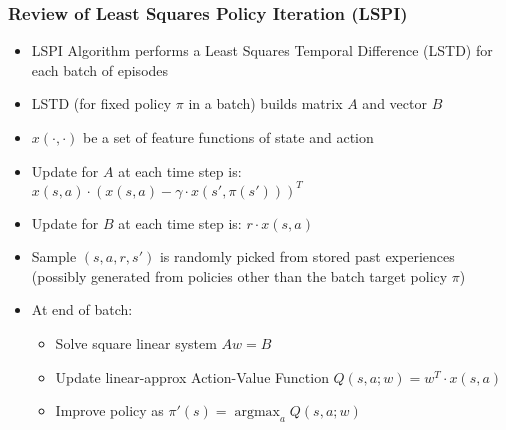 \documentclass[handout]{beamer}
\DeclareMathOperator*{\argmax}{argmax}
\begin{document}
\begin{frame}
\frametitle{Review of Least Squares Policy Iteration (LSPI)}
\pause
\begin{itemize}[<+->]
\item LSPI Algorithm performs a Least Squares Temporal Difference (LSTD) for each batch of episodes
\item LSTD (for fixed policy $\pi$ in a batch) builds matrix $A$ and vector $B$
\item $x(\cdot,\cdot)$ be a set of feature functions of state and action
\item Update for $A$ at each time step is: $x(s,a) \cdot (x(s,a) - \gamma \cdot x(s',\pi(s')))^T$
\item Update for $B$ at each time step is: $r \cdot x(s,a)$
\item Sample $(s,a,r,s')$ is randomly picked from stored past experiences (possibly generated from policies other than the batch target policy $\pi$)

\item At end of batch:
\begin{itemize}
\item Solve square linear system $Aw = B$
\item Update linear-approx Action-Value Function $Q(s,a;w) = w^T \cdot x(s,a)$
\item Improve policy as $\pi'(s) = \argmax_a Q(s,a;w)$
\end{itemize}
\end{itemize}
\end{frame}
\end{document}
